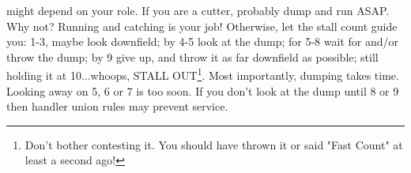\documentclass{tufte-handout}
\begin{document}
might depend on your role. 
If you are a cutter, 
probably dump 
and run ASAP. 
Why not? 
Running 
and catching  
is your job! 
Otherwise, 
let the stall count 
guide you:
1-3, maybe look downfield; 
by 4-5 look at the dump; 
for 5-8 wait for and/or throw the dump;
by 9 give up, and
throw it as far downfield as possible;
still holding it at 10...whoops, 
STALL OUT\footnote{
Don't bother 
contesting it. 
You should have thrown 
it or said "Fast Count" 
at least a second ago!}.
Most importantly, 
dumping takes time.
Looking away
on 5, 6 or 7 
is too soon.  
If you don't look 
at the dump
until 8 or 9 
then handler union rules 
may prevent service.





\end{document}
